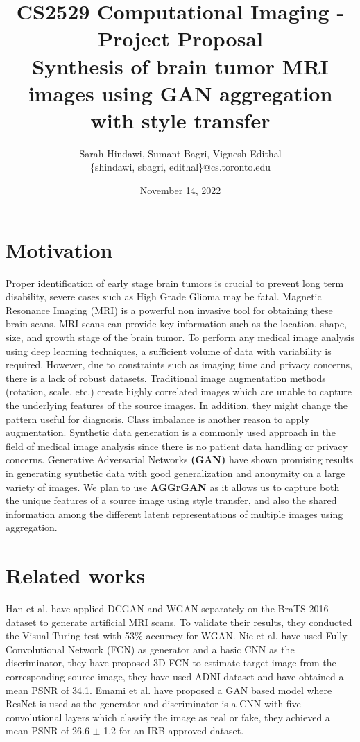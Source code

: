 \documentclass[10pt]{extarticle}
\title{
    {\large CS2529 Computational Imaging - Project Proposal} \\
    Synthesis of brain tumor MRI images using GAN aggregation with style transfer
}
\author{
  Sarah Hindawi, Sumant Bagri, Vignesh Edithal \\
  \{shindawi, sbagri, edithal\}@cs.toronto.edu
  }
\date{November 14, 2022}
\begin{document}
\maketitle

\section{Motivation}

\cite{Mukherkjee2022} Proper identification of early stage brain tumors is crucial to prevent long term disability, severe 
cases such as High Grade Glioma may be fatal. Magnetic Resonance Imaging (MRI) is a powerful non invasive tool for obtaining 
these brain scans. MRI scans can provide key information such as the location, shape, size, and growth stage of the brain 
tumor. To perform any medical image analysis using deep learning techniques, a sufficient volume of data with variability is 
required. However, due to constraints such as imaging time and privacy concerns, there is a lack of robust datasets. 
Traditional image augmentation methods (rotation, scale, etc.) create highly correlated images which are unable to capture 
the underlying features of the source images. In addition, they might change the pattern useful for diagnosis. Class 
imbalance is another reason to apply augmentation. Synthetic data generation is a commonly used approach in the field of 
medical image analysis since there is no patient data handling or privacy concerns. Generative Adversarial Networks \textbf
{(GAN)} have shown promising results in generating synthetic data with good generalization and anonymity on a large variety 
of images. We plan to use \textbf{AGGrGAN} \cite{Mukherkjee2022} as it allows us to capture both the unique features of a 
source image using style transfer, and also the shared information among the different latent representations of multiple 
images using aggregation.

\section{Related works}

\cite{Mukherkjee2022} Han et al. \cite{Han2018} have applied DCGAN and WGAN separately on the BraTS 2016 dataset to generate 
artificial MRI scans. To validate their results, they conducted the Visual Turing test with 53\% accuracy for WGAN. Nie et 
al. \cite{Nie2018} have used Fully Convolutional Network (FCN) as generator and a basic CNN as the discriminator, they have 
proposed 3D FCN to estimate target image from the corresponding source image, they have used ADNI dataset and have obtained a 
mean PSNR of 34.1. Emami et al. \cite{Emami2018} have proposed a GAN based model where ResNet is used as the generator and 
discriminator is a CNN with five convolutional layers which classify the image as real or fake, they achieved a mean PSNR of 
26.6 $\pm$ 1.2 for an IRB approved dataset.
\end{document}
